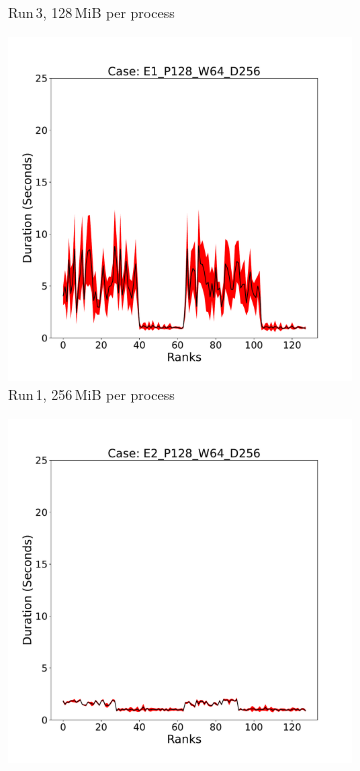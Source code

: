 \begin{figure}[h!]
\begin{subfigure}[b]{0.3\textwidth}
         \caption{Run\,3, 128\,MiB per process}
         \label{fig:E3_128_d11}
     \end{subfigure}
     \vfill
     \begin{subfigure}[b]{0.3\textwidth}
         \centering
         \includegraphics[width=\textwidth, height=\textwidth]{figures/deisa1__E1_P128_W64_D256.pdf}
         \caption{Run\,1, 256\,MiB per process }
         \label{fig:E1_256_d11}
     \end{subfigure}
     \hfill
     \begin{subfigure}[b]{0.3\textwidth}
         \centering
         \includegraphics[width=\textwidth, height=\textwidth]{figures/deisa1__E2_P128_W64_D256.pdf}

\end{subfigure}
\end{figure}
